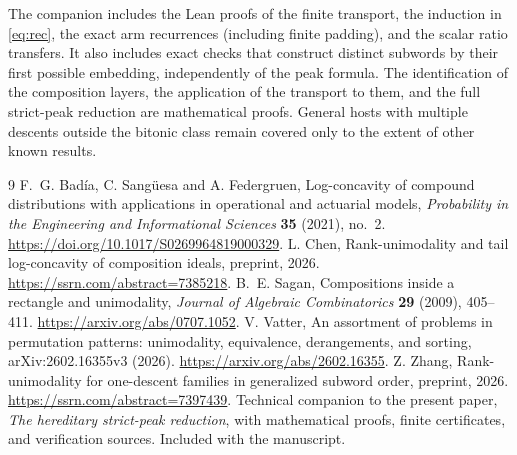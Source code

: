\documentclass[11pt]{article}
\begin{document}
The companion includes the Lean proofs of the finite transport,
the induction in \eqref{eq:rec}, the exact arm recurrences (including
finite padding), and the scalar ratio transfers. It also
includes exact checks that construct distinct subwords by their first
possible embedding, independently of the peak formula. The identification
of the composition layers, the application of the transport to them,
and the full strict-peak reduction are mathematical proofs. General
hosts with multiple descents outside the bitonic class remain covered
only to the extent of other known results.

\begin{thebibliography}{9}
 F.~G. Bad\'ia, C. Sang\"uesa and A. Federgruen,
Log-concavity of compound distributions with applications in operational
and actuarial models, \emph{Probability in the Engineering and
Informational Sciences} \textbf{35} (2021), no.~2.
\url{https://doi.org/10.1017/S0269964819000329}.
 L. Chen, Rank-unimodality and tail log-concavity of
composition ideals, preprint, 2026. \url{https://ssrn.com/abstract=7385218}.
 B.~E. Sagan, Compositions inside a rectangle and
unimodality, \emph{Journal of Algebraic Combinatorics} \textbf{29}
(2009), 405--411. \url{https://arxiv.org/abs/0707.1052}.
 V. Vatter, An assortment of problems in permutation
patterns: unimodality, equivalence, derangements, and sorting,
arXiv:2602.16355v3 (2026). \url{https://arxiv.org/abs/2602.16355}.
 Z. Zhang, Rank-unimodality for one-descent families in
generalized subword order, preprint, 2026. \url{https://ssrn.com/abstract=7397439}.
 Technical companion to the present paper,
\emph{The hereditary strict-peak reduction}, with mathematical proofs,
finite certificates, and verification sources. Included with the manuscript.
\end{thebibliography}
\end{document}
